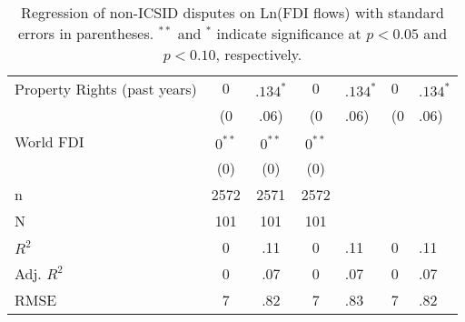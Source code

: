 \begin{table}[ht]
\begin{tabular}{lccc}
  Property Rights (past  years) & $0$&$.134^{\ast}$ & $0$&$.134^{\ast}$ & $0$&$.134^{\ast}$ \\ 
   & (0&.06) & (0&.06) & (0&.06) \\ 
  World FDI & $0^{\ast\ast}$ & $0^{\ast\ast}$ & $0^{\ast\ast}$ \\ 
   & (0) & (0) & (0) \\ 
   \hline
n & 2572 & 2571 & 2572 \\ 
  N & 101 & 101 & 101 \\ 
  $R^{2}$ & 0&.11 & 0&.11 & 0&.11 \\ 
  Adj. $R^{2}$ & 0&.07 & 0&.07 & 0&.07 \\ 
  RMSE & 7&.82 & 7&.83 & 7&.82 \\ 
   \hline
\hline
\end{tabular}
\endgroup
\caption{Regression of non-ICSID disputes on Ln(FDI flows) with standard errors in parentheses. $^{**}$ and $^{*}$ indicate significance at $p< 0.05 $ and $p< 0.10 $, respectively.} 
\end{table}
